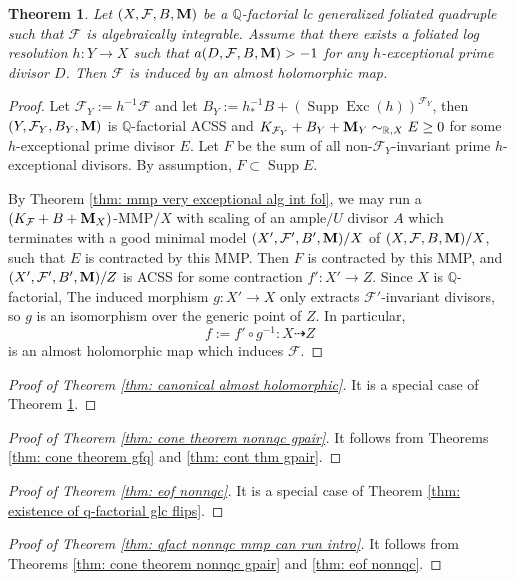 \documentclass[11pt]{amsart}
\numberwithin{equation}{section}
\newcommand{\Mm}{{\bf{M}}}
\newcommand{\Qq}{\mathbb{Q}}
\newcommand{\Exc}{\operatorname{Exc}}
\newcommand{\Supp}{\operatorname{Supp}}
\newcommand{\Ff}{\mathcal{F}}
\newtheorem{thm}{Theorem}[subsection]
\theoremstyle{definition}
\theoremstyle{definition}
\theoremstyle{definition}
\begin{document}
\begin{thm}\label{thm: almost holomorphic strong}
    Let $(X,\Ff,B,\Mm)$ be a $\Qq$-factorial lc generalized foliated quadruple such that $\Ff$ is algebraically integrable. Assume that there exists a foliated log resolution $h: Y\rightarrow X$ such that $a(D,\Ff,B,\Mm)>-1$ for any $h$-exceptional prime divisor $D$. Then $\Ff$ is induced by an almost holomorphic map.
\end{thm}
\begin{proof}
Let $\Ff_Y:=h^{-1}\Ff$ and let $B_Y:=h^{-1}_*B+(\Supp\Exc(h))^{\Ff_Y}$, then $(Y,\Ff_Y,B_Y,\Mm)$ is $\Qq$-factorial ACSS and $K_{\Ff_Y}+B_Y+\Mm_Y\sim_{\mathbb R,X}E\geq 0$ for some $h$-exceptional prime divisor $E$. Let $F$ be the sum of all non-$\Ff_Y$-invariant prime $h$-exceptional divisors. By assumption, $F\subset\Supp E$.

By Theorem \ref{thm: mmp very exceptional alg int fol}, we may run a $(K_{\Ff}+B+\Mm_X)$-MMP$/X$ with scaling of an ample$/U$ divisor $A$ which terminates with a good minimal model $(X',\Ff',B',\Mm)/X$ of $(X,\Ff,B,\Mm)/X$, such that $E$ is contracted by this MMP. Then $F$ is contracted by this MMP, and $(X',\Ff',B',\Mm)/Z$ is ACSS for some contraction $f': X'\rightarrow Z$. Since $X$ is $\Qq$-factorial, The induced morphism $g: X'\rightarrow X$ only extracts $\Ff'$-invariant divisors, so $g$ is an isomorphism over the generic point of $Z$. In particular, 
$$f:=f'\circ g^{-1}: X\dashrightarrow Z$$
is an almost holomorphic map which induces $\Ff$.
\end{proof}

\begin{proof}[Proof of Theorem \ref{thm: canonical almost holomorphic}]
    It is a special case of Theorem \ref{thm: almost holomorphic strong}.
\end{proof}


\begin{proof}[Proof of Theorem \ref{thm: cone theorem nonnqc gpair}]
It follows from Theorems \ref{thm: cone theorem gfq} and \ref{thm: cont thm gpair}.
\end{proof}


\begin{proof}[Proof of Theorem \ref{thm: eof nonnqc}]
It is a special case of Theorem \ref{thm: existence of q-factorial glc flips}.
\end{proof}


\begin{proof}[Proof of Theorem \ref{thm: qfact nonnqc mmp can run intro}]
It follows from Theorems \ref{thm: cone theorem nonnqc gpair} and \ref{thm: eof nonnqc}.
\end{proof}
\end{document}

